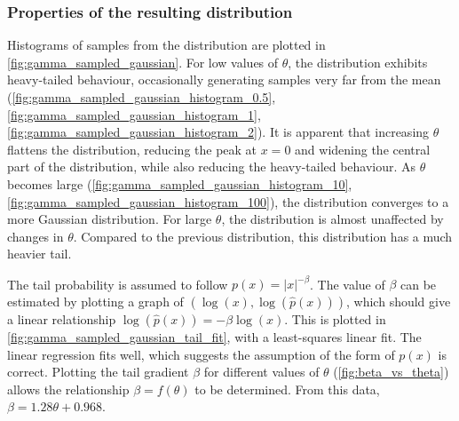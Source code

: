 \documentclass[a4paper]{article}
\begin{document}
\subsubsection{Properties of the resulting distribution}
Histograms of samples from the distribution are plotted in \autoref{fig:gamma_sampled_gaussian}.
For low values of $\theta$, the distribution exhibits heavy-tailed behaviour, occasionally generating samples very far
from the mean (\autoref{fig:gamma_sampled_gaussian_histogram_0.5}, \autoref{fig:gamma_sampled_gaussian_histogram_1},
\autoref{fig:gamma_sampled_gaussian_histogram_2}).
It is apparent that increasing $\theta$ flattens the distribution, reducing the peak at $x=0$ and widening the
central part of the distribution, while also reducing the heavy-tailed behaviour.
As $\theta$ becomes large (\autoref{fig:gamma_sampled_gaussian_histogram_10}, \autoref{fig:gamma_sampled_gaussian_histogram_100}),
the distribution converges to a more Gaussian distribution. For large $\theta$, the distribution is almost unaffected by
changes in $\theta$.
Compared to the previous distribution, this distribution has a much heavier tail.

The tail probability is assumed to follow $p(x) = |x|^{-\beta}$.
The value of $\beta$ can be estimated by plotting a graph of $\left(\log(x), \log(\hat{p}(x))\right)$, which should give
a linear relationship $\log(\hat{p}(x)) = - \beta \log(x)$.
This is plotted in \autoref{fig:gamma_sampled_gaussian_tail_fit}, with a least-squares linear fit. The linear regression
fits well, which suggests the assumption of the form of $p(x)$ is correct.
Plotting the tail gradient $\beta$ for different values of $\theta$ (\autoref{fig:beta_vs_theta}) allows the
relationship $\beta = f(\theta)$ to be determined.
From this data, $\beta = 1.28 \theta + 0.968$.
\end{document}
